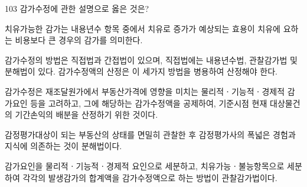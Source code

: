\begin{question}{103}
감가수정에 관한 설명으로 옳은 것은?
\begin{choices}
  \item 치유가능한 감가는 내용년수 항목 중에서 치유로 증가가 예상되는 효용이 치유에 요하는 비용보다 큰 경우의 감가를 의미한다.
  \item 감가수정의 방법은 직접법과 간접법이 있으며, 직접법에는 내용년수법, 관찰감가법 및 분해법이 있다. 감가수정액의 산정은 이 세가지 방법을 병용하여 산정해야 한다.
  \item 감가수정은 재조달원가에서 부동산가격에 영향을 미치는 물리적ㆍ기능적ㆍ경제적 감가요인 등을 고려하고, 그에 해당하는 감가수정액을 공제하여, 기준시점 현재 대상물건의 기간손익의 배분을 산정하기 위한 것이다.
  \item 감정평가대상이 되는 부동산의 상태를 면밀히 관찰한 후 감정평가사의 폭넓은 경험과 지식에 의존하는 것이 분해법이다.
  \item 감가요인을 물리적ㆍ기능적ㆍ경제적 요인으로 세분하고, 치유가능ㆍ불능항목으로 세분하여 각각의 발생감가의 합계액을 감가수정액으로 하는 방법이 관찰감가법이다.
\end{choices}
\end{question}
